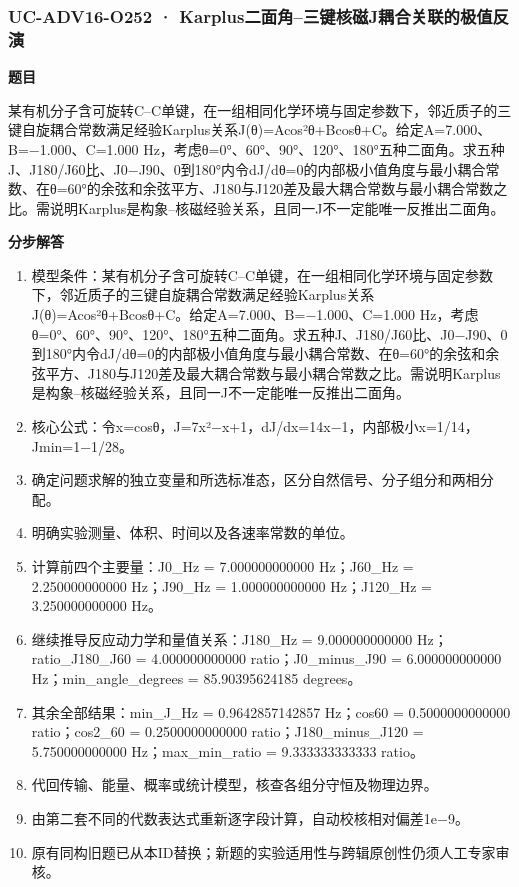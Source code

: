 \documentclass[UTF8,11pt,a4paper]{ctexart}
\begin{document}
\subsubsection*{UC-ADV16-O252 · Karplus二面角–三键核磁J耦合关联的极值反演}
\noindent\textbf{题目}\par
某有机分子含可旋转C–C单键，在一组相同化学环境与固定参数下，邻近质子的三键自旋耦合常数满足经验Karplus关系J(θ)=Acos²θ+Bcosθ+C。给定A=7.000、B=−1.000、C=1.000 Hz，考虑θ=0°、60°、90°、120°、180°五种二面角。求五种J、J180/J60比、J0−J90、0到180°内令dJ/dθ=0的内部极小值角度与最小耦合常数、在θ=60°的余弦和余弦平方、J180与J120差及最大耦合常数与最小耦合常数之比。需说明Karplus是构象–核磁经验关系，且同一J不一定能唯一反推出二面角。\par
\medskip\noindent\textbf{分步解答}
\begin{enumerate}
\item 模型条件：某有机分子含可旋转C–C单键，在一组相同化学环境与固定参数下，邻近质子的三键自旋耦合常数满足经验Karplus关系J(θ)=Acos²θ+Bcosθ+C。给定A=7.000、B=−1.000、C=1.000 Hz，考虑θ=0°、60°、90°、120°、180°五种二面角。求五种J、J180/J60比、J0−J90、0到180°内令dJ/dθ=0的内部极小值角度与最小耦合常数、在θ=60°的余弦和余弦平方、J180与J120差及最大耦合常数与最小耦合常数之比。需说明Karplus是构象–核磁经验关系，且同一J不一定能唯一反推出二面角。
\item 核心公式：令x=cosθ，J=7x²−x+1，dJ/dx=14x−1，内部极小x=1/14，Jmin=1−1/28。
\item 确定问题求解的独立变量和所选标准态，区分自然信号、分子组分和两相分配。
\item 明确实验测量、体积、时间以及各速率常数的单位。
\item 计算前四个主要量：J0\_Hz = 7.000000000000 Hz；J60\_Hz = 2.250000000000 Hz；J90\_Hz = 1.000000000000 Hz；J120\_Hz = 3.250000000000 Hz。
\item 继续推导反应动力学和量值关系：J180\_Hz = 9.000000000000 Hz；ratio\_J180\_J60 = 4.000000000000 ratio；J0\_minus\_J90 = 6.000000000000 Hz；min\_angle\_degrees = 85.90395624185 degrees。
\item 其余全部结果：min\_J\_Hz = 0.9642857142857 Hz；cos60 = 0.5000000000000 ratio；cos2\_60 = 0.2500000000000 ratio；J180\_minus\_J120 = 5.750000000000 Hz；max\_min\_ratio = 9.333333333333 ratio。
\item 代回传输、能量、概率或统计模型，核查各组分守恒及物理边界。
\item 由第二套不同的代数表达式重新逐字段计算，自动校核相对偏差1e−9。
\item 原有同构旧题已从本ID替换；新题的实验适用性与跨辑原创性仍须人工专家审核。
\end{enumerate}
\end{document}
